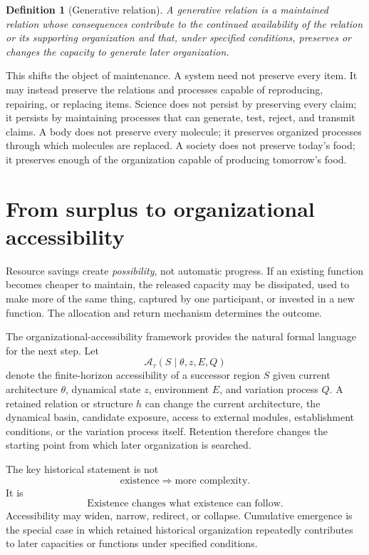 \documentclass[11pt,a4paper]{article}
\newtheorem{definition}{Definition}
\newcommand{\OA}{\mathcal{A}}
\begin{document}
\begin{definition}[Generative relation]
A generative relation is a maintained relation whose consequences contribute to the continued availability of the relation or its supporting organization and that, under specified conditions, preserves or changes the capacity to generate later organization.
\end{definition}

This shifts the object of maintenance. A system need not preserve every item. It may instead preserve the relations and processes capable of reproducing, repairing, or replacing items. Science does not persist by preserving every claim; it persists by maintaining processes that can generate, test, reject, and transmit claims. A body does not preserve every molecule; it preserves organized processes through which molecules are replaced. A society does not preserve today's food; it preserves enough of the organization capable of producing tomorrow's food.

\section{From surplus to organizational accessibility}

Resource savings create \emph{possibility}, not automatic progress. If an existing function becomes cheaper to maintain, the released capacity may be dissipated, used to make more of the same thing, captured by one participant, or invested in a new function. The allocation and return mechanism determines the outcome.

The organizational-accessibility framework provides the natural formal language for the next step. Let
\[
\OA_{\tau}(S\mid \theta,z,E,Q)
\]
denote the finite-horizon accessibility of a successor region $S$ given current architecture $\theta$, dynamical state $z$, environment $E$, and variation process $Q$. A retained relation or structure $h$ can change the current architecture, the dynamical basin, candidate exposure, access to external modules, establishment conditions, or the variation process itself. Retention therefore changes the starting point from which later organization is searched.

The key historical statement is not
\[
\text{existence} \Rightarrow \text{more complexity}.
\]
It is
\[
\boxed{\text{Existence changes what existence can follow.}}
\]
Accessibility may widen, narrow, redirect, or collapse. Cumulative emergence is the special case in which retained historical organization repeatedly contributes to later capacities or functions under specified conditions.
\end{document}
